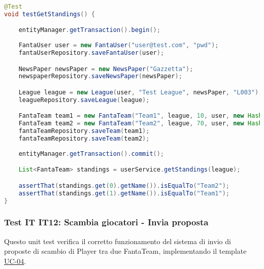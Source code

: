 \begin{lstlisting}[language=Java]
@Test
void testGetStandings() {

	entityManager.getTransaction().begin();
		
	FantaUser user = new FantaUser("user@test.com", "pwd");
	fantaUserRepository.saveFantaUser(user);

	NewsPaper newsPaper = new NewsPaper("Gazzetta");
	newspaperRepository.saveNewsPaper(newsPaper);

	League league = new League(user, "Test League", newsPaper, "L003");
	leagueRepository.saveLeague(league);

	FantaTeam team1 = new FantaTeam("Team1", league, 10, user, new HashSet<>());
	FantaTeam team2 = new FantaTeam("Team2", league, 70, user, new HashSet<>());
	fantaTeamRepository.saveTeam(team1);
	fantaTeamRepository.saveTeam(team2);
		
	entityManager.getTransaction().commit();

	List<FantaTeam> standings = userService.getStandings(league);

	assertThat(standings.get(0).getName()).isEqualTo("Team2");
	assertThat(standings.get(1).getName()).isEqualTo("Team1");
}
\end{lstlisting}


\subsubsection{Test IT IT12: Scambia giocatori - Invia proposta} \label{IT12}

Questo unit test verifica il corretto funzionamento del sistema di invio di proposte di scambio di Player tra due FantaTeam,
implementando il template \hyperref[UC-04]{UC-04}.

